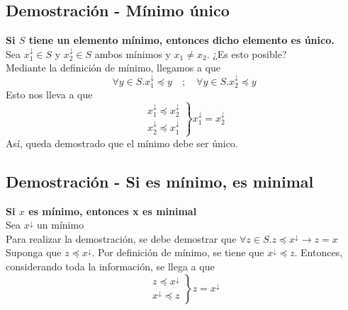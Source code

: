\documentclass[../main.tex]{subfiles}
\begin{document}
\subsection{Demostración - Mínimo único}
\label{sec:dem_min_unico}
\textbf{Si $S$ tiene un elemento mínimo, entonces dicho elemento es único.}\\
Sea $x_1^{\downarrow} \in S$ y $x_2^{\downarrow} \in S$ ambos mínimos y $x_1 \not= x_2$. ¿Es esto posible?\\
Mediante la definición de mínimo, llegamos a que
\[ \forall y \in S . x_1^{\downarrow} \preceq y \quad ; \quad \forall y \in S . x_2^{\downarrow} \preceq y \]
Esto nos lleva a que
\[
    \left.
        \begin{array}{c}
            x_1^{\downarrow} \preceq x_2^{\downarrow}\\
            x_2^{\downarrow} \preceq x_1^{\downarrow}
        \end{array}
    \right \}
    x_1^{\downarrow} = x_2^{\downarrow}
\]
Así, queda demostrado que el mínimo debe ser único.

\subsection{Demostración - Si es mínimo, es minimal}
\label{sec:dem_min_minimal}
\textbf{Si $x$ es mínimo, entonces x es minimal}\\
Sea $x^{\downarrow}$ un mínimo\\
Para realizar la demostración, se debe demostrar que $\forall z \in S . z \preceq x^{\downarrow} \rightarrow z = x$\\
Suponga que $z \preceq x^{\downarrow}$. Por definición de mínimo, se tiene que $x^{\downarrow} \preceq z$. Entonces, considerando toda la información, se llega a que
\[
    \left.
        \begin{array}{c}
            z \preceq x^{\downarrow}\\
            x^{\downarrow} \preceq z
        \end{array}
    \right \}
    z = x^{\downarrow}
\]
\end{document}
